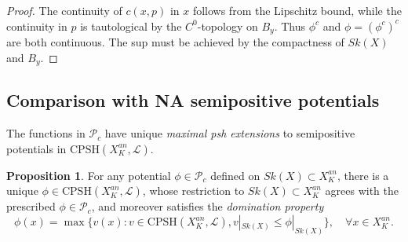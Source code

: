 \documentclass[a4paper]{article}
\theoremstyle{definition}
\newtheorem{prop}[thm]{Proposition}
\begin{document}
	
	
	\begin{proof}
	The continuity of $c(x,p)$ in $x$ follows from the Lipschitz bound, while the continuity in $p$ is tautological by the $C^0$-topology on $B_y$. Thus $\phi^c$ and $\phi=(\phi^c)^c$ are both continuous. The sup must be achieved by the compactness of $Sk(X)$ and $B_y$.
		\end{proof}
	
	

	
	
	
	\subsection{Comparison with NA semipositive potentials}\label{sec:Pcvspsh}
	
	
	
	
	The functions in $\mathcal{P}_c$ have unique \emph{maximal psh extensions} to semipositive potentials in $\text{CPSH}(X_K^{an},\mathcal{L})$.
	
	
	
	\begin{prop}\label{prop:maxextension}
		For any potential $\phi\in \mathcal{P}_c$ defined on $Sk(X)\subset X_K^{an}$, there is a unique $\phi\in  \text{CPSH}(X_K^{an},\mathcal{L})$, whose restriction to $Sk(X)\subset X_K^{an}$ agrees with the prescribed $\phi\in \mathcal{P}_c$, and moreover satisfies the 
	\emph{domination property}
		\begin{equation}\label{eqn:dominationproperty}
\phi(x)= \max\{ v(x) :v\in \text{CPSH}(X_K^{an},\mathcal{L}), v|_{Sk(X)}\leq \phi |_{Sk(X)}\},\quad \forall x\in X_K^{an}.
		\end{equation}
	\end{prop}
	
	
	
\end{document}
